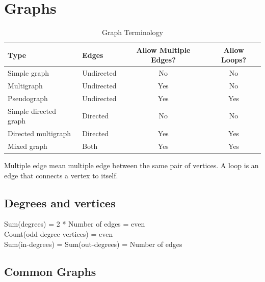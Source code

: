 \setcounter{section}{9}
\section{Graphs}

\begin{table}[h]
    \centering
    \caption{Graph Terminology}
    \begin{tabular}{llcc}
        \toprule
        \textbf{Type} & \textbf{Edges} & \textbf{Allow Multiple Edges?} & \textbf{Allow Loops?} \\
        \midrule
        Simple graph & Undirected & No & No \\
        Multigraph & Undirected & Yes & No \\
        Pseudograph & Undirected & Yes & Yes \\
        Simple directed graph & Directed & No & No \\
        Directed multigraph & Directed & Yes & Yes \\
        Mixed graph & Both & Yes & Yes \\
        \bottomrule
    \end{tabular}
\end{table}
Multiple edge mean multiple edge between the same pair of vertices. A loop is an edge that connects a vertex to itself.

\subsection{Degrees and vertices}

\begin{center}
    Sum(degrees) = 2 * Number of edges = even \\
    Count(odd degree vertices) = even \\
    Sum(in-degrees) = Sum(out-degrees) = Number of edges
\end{center}

\subsection{Common Graphs}

